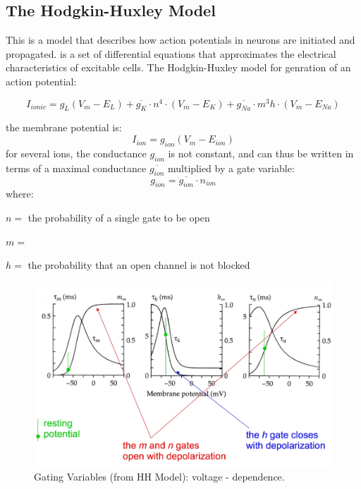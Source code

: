\documentclass[english,11pt]{article}
\begin{document}
\subsection{The Hodgkin-Huxley Model}

This is a model that describes how action potentials in neurons are initiated and propagated. is a set of differential equations that approximates the electrical characteristics of excitable cells. The Hodgkin-Huxley model for genration of an action potential:

\begin{equation}
I_{ionic}= g_L (V_m - E_L) + \overline{g_K} \cdot n^4 \cdot (V_m - E_K) + \overline{g_{Na}} \cdot m^3h \cdot (V_m - E_{Na})
\end{equation}

the membrane potential is:
\begin{equation}
I_{ion}= g_{ion} (V_m - E_{ion})
\end{equation}
for several ions, the conductance $g_{ion}$ is not constant, and can thus be written in terms of a maximal conductance $\overline{g_{ion}}$ multiplied by a gate variable:
\begin{equation}
g_{ion} = \overline{g_{ion}} \cdot n_{ion}
\end{equation}
where: 

$n = $ the probability of a single gate to be open

$m = $ 

$h =$ the probability that an open channel is not blocked

\begin{figure}[htbp]
\centering
  \includegraphics[scale=0.4]{images/5_8.jpg}
  \caption{Gating Variables (from HH Model): voltage - dependence.}
\end{figure} 
\end{document}
